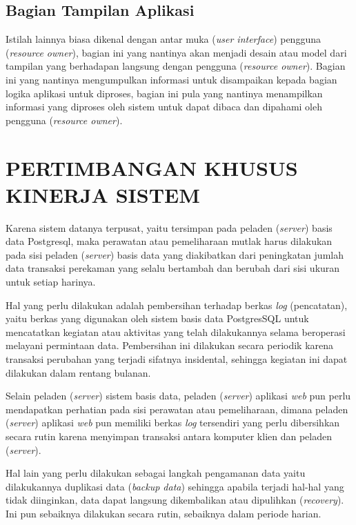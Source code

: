 \documentclass[pdftex,12pt, oneside]{article}
\begin{document}
\subsection{Bagian Tampilan Aplikasi}

Istilah lainnya biasa dikenal dengan antar muka (\textit{user interface}) pengguna (\textit{resource owner}), bagian ini yang nantinya akan menjadi desain atau model dari tampilan yang berhadapan langsung dengan pengguna (\textit{resource owner}). Bagian ini yang nantinya mengumpulkan informasi untuk disampaikan kepada bagian logika aplikasi untuk diproses, bagian ini pula yang nantinya menampilkan informasi yang diproses oleh sistem untuk dapat dibaca dan dipahami oleh pengguna (\textit{resource owner}).

\section{PERTIMBANGAN KHUSUS KINERJA SISTEM}

Karena sistem datanya terpusat, yaitu tersimpan pada peladen (\textit{server}) basis data Postgresql, maka perawatan atau pemeliharaan mutlak harus dilakukan pada sisi peladen (\textit{server}) basis data yang diakibatkan dari peningkatan jumlah data transaksi perekaman yang selalu bertambah dan berubah dari sisi ukuran untuk setiap harinya.

Hal yang perlu dilakukan adalah pembersihan terhadap berkas \textit{log} (pencatatan), yaitu berkas yang digunakan oleh sistem basis data PostgresSQL untuk mencatatkan kegiatan atau aktivitas yang telah dilakukannya selama beroperasi melayani permintaan data. Pembersihan ini dilakukan secara periodik karena transaksi perubahan yang terjadi sifatnya insidental, sehingga kegiatan ini dapat dilakukan dalam rentang bulanan.

Selain peladen (\textit{server}) sistem basis data, peladen (\textit{server}) aplikasi \textit{web} pun perlu mendapatkan perhatian pada sisi perawatan atau pemeliharaan, dimana peladen (\textit{server}) aplikasi \textit{web} pun memiliki berkas \textit{log} tersendiri yang perlu dibersihkan secara rutin karena menyimpan transaksi antara komputer klien dan peladen (\textit{server}).

Hal lain yang perlu dilakukan sebagai langkah pengamanan data yaitu dilakukannya duplikasi data (\textit{backup data}) sehingga apabila terjadi hal-hal yang tidak diinginkan, data dapat langsung dikembalikan atau dipulihkan (\textit{recovery}). Ini pun sebaiknya dilakukan secara rutin, sebaiknya dalam periode harian.
\end{document}
